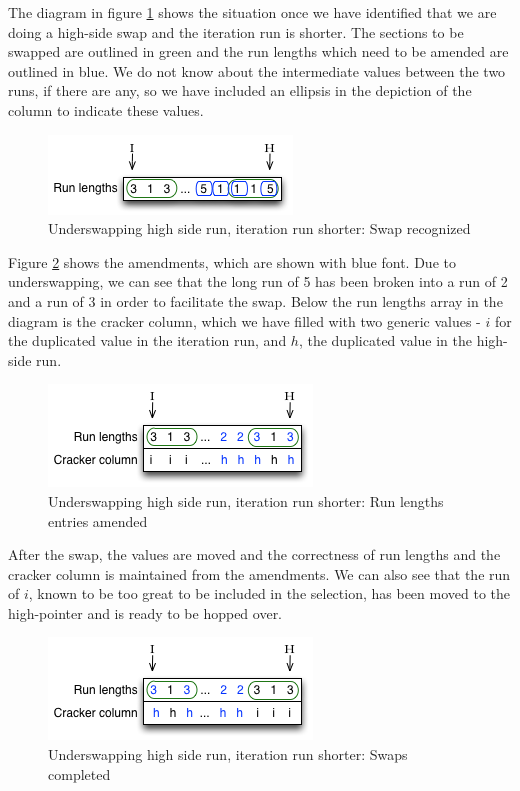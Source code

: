 The diagram in figure \ref{fig:underswapping_1a} shows the situation once we have identified that we are doing a high-side swap and the iteration run is shorter. The sections to be swapped are outlined in green and the run lengths which need to be amended are outlined in blue. We do not know about the intermediate values between the two runs, if there are any, so we have included an ellipsis in the depiction of the column to indicate these values.

\begin{figure}[H]
  \centering
  \includegraphics[]{images/d18_underswapping_1a}
  \caption{Underswapping high side run, iteration run shorter: Swap recognized}
  \label{fig:underswapping_1a}
\end{figure}

Figure \ref{fig:underswapping_1b} shows the amendments, which are shown with blue font. Due to underswapping, we can see that the long run of 5 has been broken into a run of 2 and a run of 3 in order to facilitate the swap. Below the run lengths array in the diagram is the cracker column, which we have filled with two generic values - $i$ for the duplicated value in the iteration run, and $h$, the duplicated value in the high-side run.

\begin{figure}[H]
  \centering
  \includegraphics[]{images/d18_underswapping_1b}
  \caption{Underswapping high side run, iteration run shorter: Run lengths entries amended}
  \label{fig:underswapping_1b}
\end{figure}

After the swap, the values are moved and the correctness of run lengths and the cracker column is maintained from the amendments. We can also see that the run of $i$, known to be too great to be included in the selection, has been moved to the high-pointer and is ready to be hopped over.

\begin{figure}[H]
  \centering
  \includegraphics[]{images/d18_underswapping_1c}
  \caption{Underswapping high side run, iteration run shorter: Swaps completed}
  \label{fig:underswapping_1c}
\end{figure}

